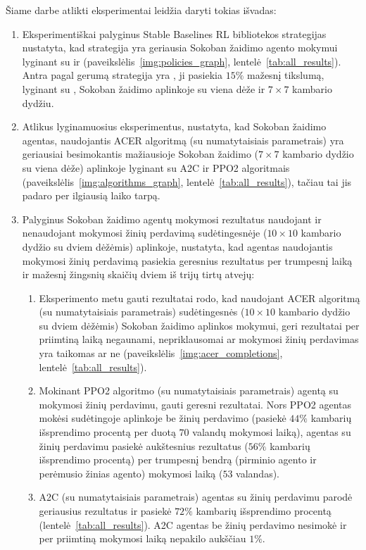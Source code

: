 \documentclass{VUMIFPSbakalaurinis}
\begin{document}
{
	Šiame darbe atlikti eksperimentai leidžia daryti tokias išvadas:
	\begin{enumerate}
		\item Eksperimentiškai palyginus Stable Baselines RL bibliotekos strategijas nustatyta, kad  strategija yra geriausia Sokoban žaidimo agento mokymui lyginant su  ir  (paveikslėlis~\ref{img:policies_graph}, lentelė~\ref{tab:all_results}). Antra pagal gerumą strategija yra , ji pasiekia \(15\%\) mažesnį tikslumą, lyginant su , Sokoban žaidimo aplinkoje su viena dėže ir \(7 \times 7\) kambario dydžiu.
		
		\item Atlikus lyginamuosius eksperimentus, nustatyta, kad Sokoban žaidimo agentas, naudojantis ACER algoritmą (su numatytaisiais parametrais) yra geriausiai besimokantis mažiausioje Sokoban žaidimo (\(7 \times 7\) kambario dydžio su viena dėže) aplinkoje lyginant su A2C ir PPO2 algoritmais (paveikslėlis~\ref{img:algorithms_graph}, lentelė~\ref{tab:all_results}), tačiau tai jis padaro per ilgiausią laiko tarpą.
		
		\item Palyginus Sokoban žaidimo agentų mokymosi rezultatus naudojant ir nenaudojant mokymosi žinių perdavimą sudėtingesnėje (\(10 \times 10\) kambario dydžio su dviem dėžėmis) aplinkoje, nustatyta, kad agentas naudojantis mokymosi žinių perdavimą pasiekia geresnius rezultatus per trumpesnį laiką ir mažesnį žingsnių skaičių dviem iš trijų tirtų atvejų:
		\begin{enumerate}
			\item Eksperimento metu gauti rezultatai rodo, kad naudojant ACER algoritmą (su numatytaisiais parametrais) sudėtingesnės (\(10 \times 10\) kambario dydžio su dviem dėžėmis) Sokoban žaidimo aplinkos mokymui, geri rezultatai per priimtiną laiką negaunami, nepriklausomai ar mokymosi žinių perdavimas yra taikomas ar ne (paveikslėlis~\ref{img:acer_completions}, lentelė~\ref{tab:all_results}).
			
			\item Mokinant PPO2 algoritmo (su numatytaisiais parametrais) agentą su mokymosi žinių perdavimu, gauti geresni rezultatai. Nors PPO2 agentas mokėsi sudėtingoje aplinkoje be žinių perdavimo (pasiekė \(44\%\) kambarių išsprendimo procentą per duotą \(70\) valandų mokymosi laiką), agentas su žinių perdavimu pasiekė aukštesnius rezultatus (\(56\%\) kambarių išsprendimo procentą) per trumpesnį bendrą (pirminio agento ir perėmusio žinias agento) mokymosi laiką (\(53\) valandas).
			
			\item A2C (su numatytaisiais parametrais) agentas su žinių perdavimu parodė geriausius rezultatus ir pasiekė \(72\%\) kambarių išsprendimo procentą (lentelė~\ref{tab:all_results}). A2C agentas be žinių perdavimo nesimokė ir per priimtiną mokymosi laiką nepakilo aukščiau \(1\%\).
		\end{enumerate}
	\end{enumerate}
}
\printbibliography[heading=bibintoc] 
\end{document}

